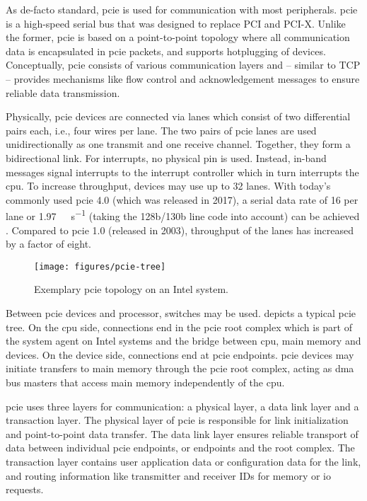 As de-facto standard, \acf{pcie} is used for communication with most
peripherals. \ac{pcie} is a high-speed serial bus that was designed to replace
PCI and PCI-X. Unlike the former, \ac{pcie} is based on a point-to-point
topology where all communication data is encapsulated in \ac{pcie} packets, and
supports hotplugging of devices. Conceptually, \ac{pcie} consists of various
communication layers and -- similar to TCP -- provides mechanisms like flow
control and acknowledgement messages to ensure reliable data transmission.

Physically, \ac{pcie} devices are connected via lanes which consist of two
differential pairs each, i.e., four wires per lane. The two pairs of \ac{pcie}
lanes are used unidirectionally as one transmit and one receive channel.
Together, they form a bidirectional link. For interrupts, no physical pin is
used. Instead, in-band messages signal interrupts to the interrupt controller
which in turn interrupts the \ac{cpu}. To increase throughput, devices may use
up to 32 lanes. With today's commonly used \ac{pcie} 4.0 (which was released in
2017), a serial data rate of \SI{16}{\Gbps} per lane or
\SI{1.97}{\giga\byte\per\second} (taking the 128b/130b line code into account)
can be achieved \cite{pcie2017specification}. Compared to \ac{pcie} 1.0
(released in 2003), throughput of the lanes has increased by a factor of eight.

\begin{figure}
    \centering
    \texttt{[image: figures/pcie-tree]}
    \caption{Exemplary \acs{pcie} topology on an Intel system.}
    \label{fig:pcie-topology}
\end{figure}

Between \ac{pcie} devices and processor, switches may be used.
 depicts a typical \ac{pcie} tree. On the \ac{cpu} side,
connections end in the \ac{pcie} root complex which is part of the system agent
on Intel systems and the bridge between \ac{cpu}, main memory and devices. On
the device side, connections end at \ac{pcie} endpoints. \ac{pcie} devices may
initiate transfers to main memory through the \ac{pcie} root complex, acting as
\acs{dma} bus masters that access main memory independently of the \ac{cpu}.

\ac{pcie} uses three layers for communication: a physical layer, a data link
layer and a transaction layer. The physical layer of \ac{pcie} is responsible
for link initialization and point-to-point data transfer. The data link layer
ensures reliable transport of data between individual \ac{pcie} endpoints, or
endpoints and the root complex. The transaction layer contains user application
data or configuration data for the link, and routing information like
transmitter and receiver IDs for memory or \ac{io} requests.

